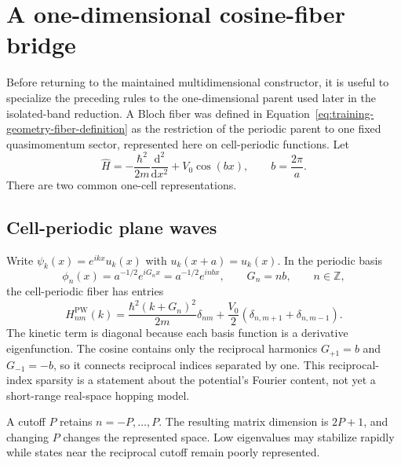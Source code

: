 \section{A one-dimensional cosine-fiber bridge}

Before returning to the maintained multidimensional constructor, it is useful
to specialize the preceding rules to the one-dimensional parent used later in
the isolated-band reduction. A Bloch fiber was defined in
Equation~\eqref{eq:training-geometry-fiber-definition} as the restriction of the
periodic parent to one fixed quasimomentum sector, represented here on
cell-periodic functions. Let
\begin{equation}
  \widehat H
  =-\frac{\hbar^2}{2m}\frac{\mathrm d^2}{\mathrm d x^2}
   +V_0\cos(bx),
  \qquad
  b=\frac{2\pi}{a}.
  \label{eq:training-fd-one-dimensional-parent}
\end{equation}
There are two common one-cell representations.

\subsection{Cell-periodic plane waves}

Write $\psi_k(x)=e^{ikx}u_k(x)$ with $u_k(x+a)=u_k(x)$. In the periodic basis
\begin{equation}
  \phi_n(x)=a^{-1/2}e^{iG_nx}=a^{-1/2}e^{inbx},
  \qquad G_n=nb,
  \qquad n\in\mathbb Z,
\end{equation}
the cell-periodic fiber has entries
\begin{equation}
  H^{\mathrm{PW}}_{nm}(k)
  =\frac{\hbar^2(k+G_n)^2}{2m}\delta_{nm}
   +\frac{V_0}{2}
    \left(\delta_{n,m+1}+\delta_{n,m-1}\right).
  \label{eq:training-fd-one-dimensional-plane-wave}
\end{equation}
The kinetic term is diagonal because each basis function is a derivative
eigenfunction. The cosine contains only the reciprocal harmonics
$G_{+1}=b$ and $G_{-1}=-b$, so it connects reciprocal indices separated by
one. This reciprocal-index sparsity
is a statement about the potential's Fourier content, not yet a short-range
real-space hopping model.

A cutoff $P$ retains $n=-P,\ldots,P$. The resulting matrix dimension is
$2P+1$, and changing $P$ changes the represented space. Low eigenvalues may
stabilize rapidly while states near the reciprocal cutoff remain poorly
represented.

